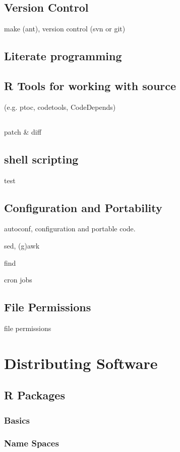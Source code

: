 \documentclass[11pt]{book}
\begin{document}
\section{Version Control}
 make (ant), version control (svn or git)

\section{Literate programming}

\section{R Tools for working with source}
 (e.g. ptoc, codetools, CodeDepends)

\section{}
 patch \& diff

\section{shell scripting}

  test

\section{Configuration and Portability}

 autoconf, configuration and portable code.


 sed, (g)awk

 find

 cron jobs

\section{File Permissions}
 file permissions


\chapter{Distributing Software}
  \section{R Packages}
   \subsection{Basics}
   \subsection{Name Spaces}
\end{document}
